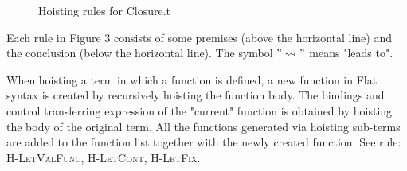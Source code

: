 \documentclass{article}
\theoremstyle{definition}
\theoremstyle{remark}
\numberwithin{equation}{section}
\begin{document}
\begin{figure}[!ht]
  \caption{Hoisting rules for Closure.t}
  \label{fig-sub}
\end{figure}

Each rule in Figure 3 consists of some premises (above the horizontal line)
and the conclusion (below the horizontal line). The symbol $"\leadsto"$ means
"leads to".

When hoisting a term in which a function is defined, a new function in Flat
syntax is created by recursively hoisting the function body.
 The bindings and control transferring expression of the "current"
function is obtained by hoisting the body of the original term. All the
functions generated via hoisting sub-terms are added to the function list
 together with the newly created function. See rule: \textsc{H-LetValFunc,
  H-LetCont, H-LetFix}.
\end{document}
